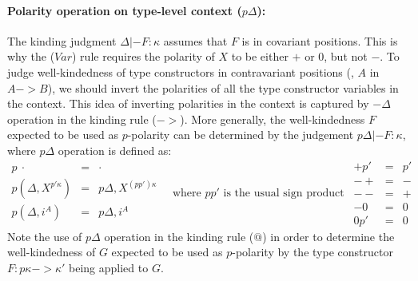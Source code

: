 \paragraph{Polarity operation on type-level context ($p\Delta$):}
The kinding judgment $\Delta |- F : \kappa$ assumes that $F$ is in covariant
positions. This is why the ($Var$) rule requires the polarity of $X$ to be
either $+$ or $0$, but not $-$. To judge well-kindedness of type constructors
in contravariant positions (\eg, $A$ in $A -> B$), we should invert
the polarities of all the type constructor variables in the context.
This idea of inverting polarities in the context is captured by $-\Delta$
operation in the kinding rule ($->$). More generally, the well-kindedness $F$
expected to be used as $p$-polarity can be determined by the judgement
$p\Delta |- F : \kappa$, where $p\Delta$ operation is defined as:
\[
\begin{array}{lcl}
p~\cdot &=& \cdot \\
p(\Delta,X^{p'\kappa}) &=& p\Delta,X^{(pp')\kappa} \\
p(\Delta,i^A) &=& p\Delta,i^A
\end{array}
\quad\text{where $pp'$ is the usual sign product}~~
\begin{smallmatrix}
+ p' & = & p' \\
- +  & = & -  \\
- -  & = & +  \\
- 0  & = & 0  \\
0 p' & = & 0
\end{smallmatrix}
\]
Note the use of $p\Delta$ operation in the kinding rule ($@$) in order to
determine the well-kindedness of $G$ expected to be used as $p$-polarity
by the type constructor $F : p\kappa -> \kappa'$ being applied to $G$.

